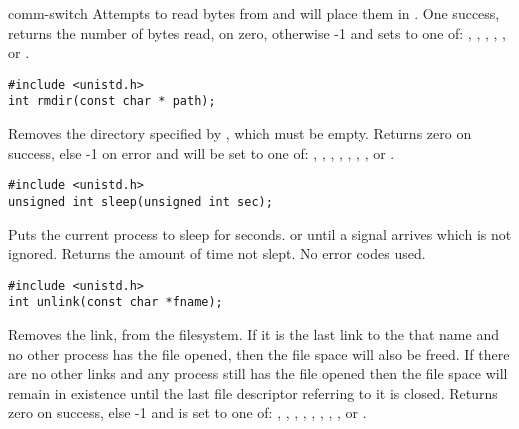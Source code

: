 \begin{Ventry2}{comm-switch  }
Attempts to read  bytes from  and will place
them in . One success, returns the number of bytes read,
on  zero, otherwise -1 and sets  to one of:
, , , , , or 
.


\item[rmdir]
\label{item:rmdir}
\begin{production}
\begin{verbatim}
#include <unistd.h>
int rmdir(const char * path);
\end{verbatim}
\end{production}
 
Removes the directory specified by , which must be empty.
Returns zero on success, else -1 on error and
 will be set to one of: , ,
, , , ,
 ,  or .


\item[sleep]
\label{item:sleep}
\begin{production}
\begin{verbatim}
#include <unistd.h>
unsigned int sleep(unsigned int sec);
\end{verbatim}
\end{production}

Puts the current process to sleep for   seconds.
or until a signal arrives which is not ignored. Returns
the amount of time not slept. No error codes used.

\item[unlink]
\label{item:unlink}
\begin{production}
\begin{verbatim}
#include <unistd.h>
int unlink(const char *fname);
\end{verbatim}
\end{production}

Removes the link,  from the filesystem. If it is the last
link to the that name and no other process has the file opened, then
the file space will also be freed. If there are no other links and any
process still has the file opened then the file space will remain in
existence until the last file descriptor referring to it is
closed. Returns zero on success, else -1 and 
 is set to one of: , , , 
, , , ,  , or .



\end{Ventry2}
